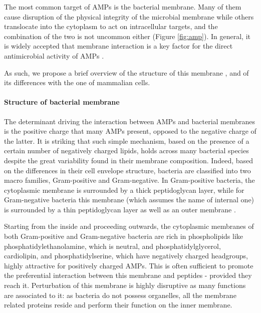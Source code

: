 The most common target of AMPs is the bacterial membrane. Many of them cause disruption of the physical integrity of the microbial membrane while others translocate into the cytoplasm to act on intracellular targets, and the combination of the two is not uncommon either \cite{Hancock2006} (Figure \ref{fig:amp}). In general, it is widely accepted that membrane interaction is a key factor for the direct antimicrobial activity of AMPs \cite{Nguyen2011}.

As such, we propose a brief overview of the structure of this membrane \cite{Silhavy}, and of its differences with the one of mammalian cells.


\paragraph{Structure of bacterial membrane}
The determinant driving the interaction between AMPs and bacterial membranes is the positive charge that many AMPs present, opposed to the negative charge of the latter.
%
It is striking that such simple mechanism, based on the presence of a certain number of negatively charged lipids, holds across many bacterial species despite the great variability found in their membrane composition.
%
Indeed, based on the differences in their cell envelope structure, bacteria are classified into two macro families, Gram-positive and Gram-negative.
%
In Gram-positive bacteria, the cytoplasmic membrane is surrounded by a thick peptidoglycan layer, while for Gram-negative bacteria this membrane (which assumes the name of internal one) is surrounded by a thin peptidoglycan layer as well as an outer membrane \cite{Lin2016}.

Starting from the inside and proceeding outwards, the cytoplasmic membranes of both Gram-positive and Gram-negative bacteria are rich in phospholipids like phosphatidylethanolamine, which is neutral, and phosphatidylglycerol, cardiolipin, and phosphatidylserine, which have negatively charged headgroups, highly attractive for positively charged AMPs. This is often sufficient to promote the preferential interaction between this membrane and peptides - provided they reach it.
%
Perturbation of this membrane is highly disruptive as many functions are associated to it: as bacteria do not possess organelles, all the membrane related proteins reside and perform their function on the inner membrane. 


